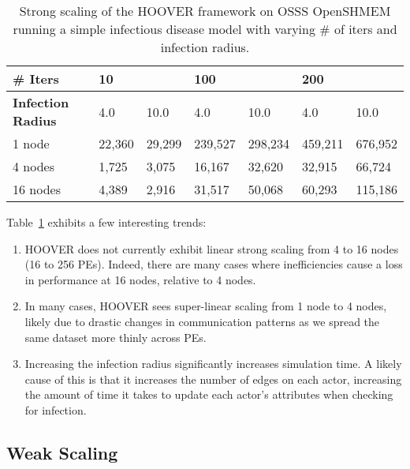 \begin{table}
\centering
\begin{tabularx}{\textwidth}{ | l || X | X | X | X | X | X | }
\hline
\textbf{\# Iters}           & \multicolumn{2}{|X|}{\textbf{10}} & \multicolumn{2}{|X|}{\textbf{100}} & \multicolumn{2}{|X|}{\textbf{200}} \\\hline
\textbf{Infection Radius}   & 4.0          & 10.0         & 4.0           & 10.0          & 4.0           & 10.0 \\\hline
1 node                      & 22,360 & 29,299 & 239,527 & 298,234 & 459,211 & 676,952 \\\hline
4 nodes                     & 1,725  & 3,075  & 16,167  & 32,620  & 32,915  & 66,724 \\\hline
16 nodes                    & 4,389  & 2,916  & 31,517  & 50,068  & 60,293  & 115,186 \\\hline
\end{tabularx}
\caption{Strong scaling of the HOOVER framework on OSSS OpenSHMEM running a
    simple infectious disease model with varying \# of iters and infection
    radius.}
\label{tab:strong_scaling}
\end{table}

Table~\ref{tab:strong_scaling} exhibits a few interesting trends:

\begin{enumerate}
    \item HOOVER does not currently exhibit linear strong scaling from 4 to 16
        nodes (16 to 256 PEs). Indeed, there are many cases where inefficiencies
        cause a loss in performance at 16 nodes, relative to 4 nodes.
    \item In many cases, HOOVER sees super-linear scaling from 1 node to 4
        nodes, likely due to drastic changes in communication patterns as we
        spread the same dataset more thinly across PEs.
    \item Increasing the infection radius significantly increases simulation
        time. A likely cause of this is that it increases the number of edges on
        each actor, increasing the amount of time it takes to update each
        actor's attributes when checking for infection.
\end{enumerate}

\subsection{Weak Scaling}
\label{sec:weak_scaling}

